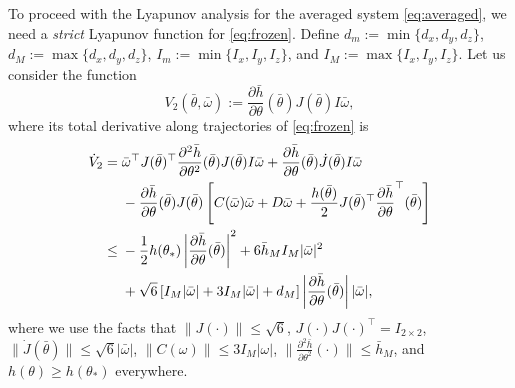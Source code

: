 \documentclass{ifacconf}
\begin{document}
To proceed with the Lyapunov analysis for the averaged system \eqref{eq:averaged}, we need a \textit{strict} Lyapunov function for \eqref{eq:frozen}. Define $d_m:=\min\{d_x,d_y,d_z\}$, $d_M:=\max\{d_x,d_y,d_z\}$, $I_m:=\min\{I_x,I_y,I_z\}$, and $I_M:=\max\{I_x,I_y,I_z\}$. Let us consider the function
\begin{equation}
	V_2(\bar{\theta},\bar{\omega}):=\frac{\partial \bar{h}}{\partial \theta}(\bar{\theta}) J(\bar{\theta}) I\bar{\omega},
\end{equation}
where its total derivative along trajectories of \eqref{eq:frozen} is
\begin{align}
    \dot{V}_2=\;&\bar{\omega}^\top J(\bar{\theta})^\top \frac{\partial^2 \bar{h}}{\partial \theta^2}(\bar{\theta})J(\bar{\theta})I\bar{\omega} + \frac{\partial \bar{h}}{\partial \theta}(\bar{\theta}) \dot{J}(\bar{\theta}) I\bar{\omega}
    \notag \\
    & -\frac{\partial \bar{h}}{\partial \theta}(\bar{\theta}) J(\bar{\theta}) \left[ C(\bar{\omega})\bar{\omega} + D\bar{\omega} + \frac{h(\bar{\theta})}{2}J(\bar{\theta})^\top \frac{\partial \bar{h}}{\partial \theta}^\top(\bar{\theta})\right] \notag \\
    \le \;&  -\frac{1}{2}    h(\theta_*) \left|\frac{\partial \bar{h}}{\partial \theta}(\bar{\theta}) \right|^2+                   6\bar{h}_MI_M|\bar{\omega}|^2   \notag\\
    & + \sqrt{6}\left[I_M|\bar{\omega}| + 3I_M|\bar{\omega}| + d_M\right]\left|\frac{\partial \bar{h}}{\partial \theta}(\bar{\theta}) \right||\bar{\omega}|,\label{eq:dot_V2}
\end{align}
where we use the facts that $\|J(\cdot)\|\le \sqrt{6}$, $J(\cdot)J(\cdot)^\top = I_{2\times 2}$, $\|\dot{J}(\bar{\theta})\|\le \sqrt{6}|\bar{\omega}|$, $\|C(\omega)\|\le 3I_M|\omega|$, $\|\frac{\partial^2 \bar{h}}{\partial \theta^2}(\cdot)\|\le \bar{h}_M$, and $h(\theta)\ge h(\theta_*)$ everywhere.
\end{document}
